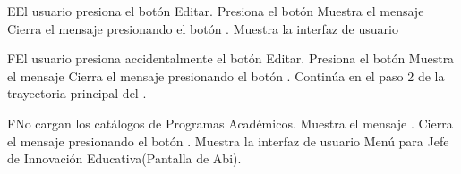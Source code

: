 \begin{UCtrayectoriaA}{E}{El usuario presiona el botón Editar.}
	\UCpaso[\UCactor] Presiona el botón 
    \UCpaso Muestra el mensaje 
    \UCpaso[\UCactor] Cierra el mensaje presionando el botón .
\UCpaso Muestra la interfaz de usuario 
\end{UCtrayectoriaA}


\begin{UCtrayectoriaA}{F}{El usuario presiona accidentalmente el botón Editar.}
	\UCpaso[\UCactor] Presiona el botón 
    \UCpaso Muestra el mensaje 
    \UCpaso[\UCactor] Cierra el mensaje presionando el botón .
    \UCpaso Continúa en el paso 2 de la trayectoria principal del .
\end{UCtrayectoriaA}

\begin{UCtrayectoriaA}{F}{No cargan los catálogos de Programas Académicos.}
    \UCpaso Muestra el mensaje .
    \UCpaso[\UCactor] Cierra el mensaje presionando el botón .
\UCpaso Muestra la interfaz de usuario Menú para Jefe de Innovación Educativa(Pantalla de Abi).
\end{UCtrayectoriaA}

